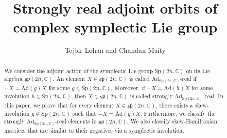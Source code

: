 \documentclass[11pt,reqno]{amsart}
\numberwithin{equation}{section}
\theoremstyle{definition}
\begin{document}
\title[Adjoint reality in complex symplectic Lie algebra]{Strongly real adjoint orbits of complex symplectic Lie group}



 \author[ T. Lohan and C. Maity]{Tejbir Lohan and Chandan Maity}
 

\address{Indian Institute of Technology Kanpur, Kanpur-208016, Uttar Pradesh, India}


\address{Indian Institute of Science Education and Research (IISER) Berhampur, 
	Berhampur-760010, Odisha, India}

\makeatletter
{}
\makeatother




\begin{abstract} We consider the adjoint action of the symplectic Lie group $\mathrm{Sp}(2n,\mathbb{C})$ on its Lie algebra $\mathfrak{sp}(2n,\mathbb{C})$. An element  $X \in \mathfrak{sp}(2n,\mathbb{C})$ is called $\mathrm{Ad}_{\mathrm{Sp}(2n,\mathbb{C})}$-real  if $ -X = \mathrm{Ad}(g)X$ for some $g \in \mathrm{Sp}(2n,\mathbb{C})$. Moreover, if  $ -X = \mathrm{Ad}(h)X $ for some involution  $h \in \mathrm{Sp}(2n,\mathbb{C})$, then $X \in \mathfrak{sp}(2n,\mathbb{C})$ is called strongly $\mathrm{Ad}_{\mathrm{Sp}(2n,\mathbb{C})}$-real. In this paper, we prove that for every element $X \in \mathfrak{sp}(2n,\mathbb{C})$, there exists a skew-involution $g \in  \mathrm{Sp}(2n,\mathbb{C})$ such that $-X =\mathrm{Ad}(g)X$. Furthermore, we classify the strongly $\mathrm{Ad}_{\mathrm{Sp}(2n,\mathbb{C})}$-real elements in $\mathfrak{sp}(2n,\mathbb{C})$. We also classify skew-Hamiltonian matrices that are similar to their negatives via a symplectic involution.
\end{abstract}



\maketitle 
\setcounter{tocdepth}{1}
\end{document}
